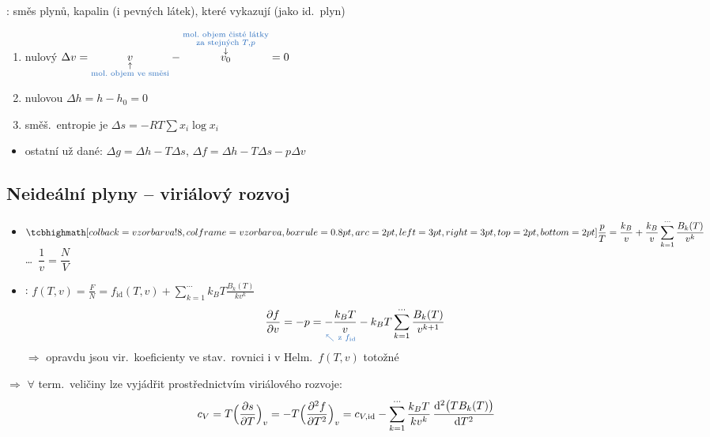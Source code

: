 \begin{definice}
: směs plynů, kapalin (i pevných látek), které vykazují (jako id.\ plyn)
\begin{enumerate}[label=\roman*)]
  \item nulový  \quad
        $\Delta v = \underset{\substack{\uparrow\\ \textcolor{NavyBlue}{\text{mol.\ objem ve směsi}}}}{v} - \overset{\substack{\textcolor{NavyBlue}{\text{mol.\ objem čisté látky}}\\ \textcolor{NavyBlue}{\text{za stejných } T,p}\\ \downarrow}}{v_0} = 0$
  \item nulovou  \quad $\Delta h = h - h_0 = 0$
  \item směš.\ entropie je \quad $\Delta s = -RT\sum x_i\log x_i$
\end{enumerate}
\begin{itemize}
  \item ostatní už dané: \quad $\Delta g = \Delta h - T\Delta s$, \quad $\Delta f = \Delta h - T\Delta s - p\Delta v$
\end{itemize}
\end{definice}

\subsection*{Neideální plyny -- viriálový rozvoj}
\begin{itemize}
  \item $\displaystyle\vzorec{\frac{p}{T} = \frac{k_B}{v} + \frac{k_B}{v}\sum_{k=1}^{\cdots}\frac{B_k(T)}{v^k}}$ \qquad \dots\ $\dfrac1v = \dfrac{N}{V}$
  \item {}: \quad $\displaystyle f(T,v) = \frac{F}{N} = f_{\mathrm{id}}(T,v) + \sum_{k=1}^{\cdots}k_BT\frac{B_k(T)}{kv^k}$
  \[
    \pdv{f}{v} = -p = \underset{\textcolor{NavyBlue}{\nwarrow\ \text{z } f_{\mathrm{id}}}}{-\frac{k_BT}{v}} - k_BT\sum_{k=1}^{\cdots}\frac{B_k(T)}{v^{k+1}}
  \]
  $\Rightarrow$ opravdu jsou vir.\ koeficienty ve stav.\ rovnici i v Helm.\ $f(T,v)$ totožné
\end{itemize}

$\Rightarrow$ $\forall$ term.\ veličiny lze vyjádřit prostřednictvím viriálového rozvoje:
\[
  c_V = T\Big(\pdv{s}{T}\Big)_v = -T\Big(\pdv[2]{f}{T}\Big)_v
  = c_{V,\mathrm{id}} - \sum_{k=1}^{\cdots}\frac{k_BT}{kv^k}\,\frac{\dd^2\big(TB_k(T)\big)}{\dd T^2}
\]

